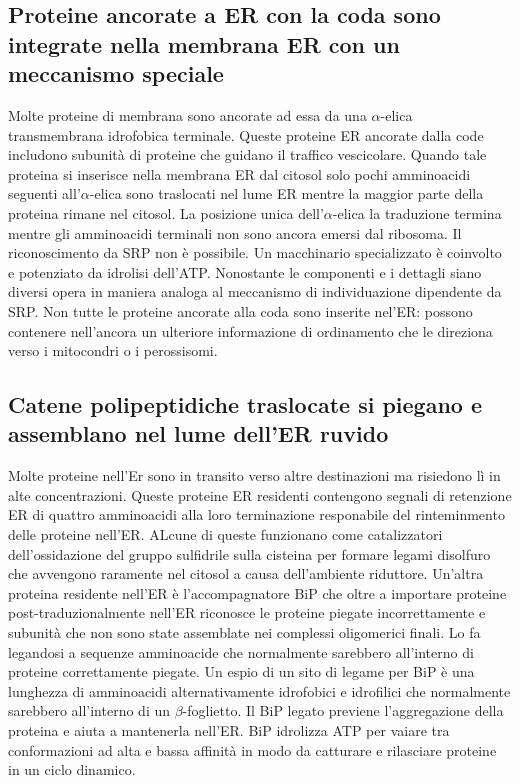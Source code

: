 \subsection{Proteine ancorate a ER con la coda sono integrate nella membrana ER con un meccanismo speciale}
Molte proteine di membrana sono ancorate ad essa da una $\alpha$-elica transmembrana idrofobica  terminale. Queste proteine ER ancorate dalla code includono subunit\`a di proteine 
che guidano il traffico vescicolare. Quando tale proteina si inserisce nella membrana ER dal citosol  solo pochi amminoacidi seguenti all'$\alpha$-elica sono traslocati nel lume ER 
mentre la maggior parte della proteina rimane nel citosol. La posizione unica dell'$\alpha$-elica la traduzione termina mentre gli amminoacidi  terminali non sono ancora emersi
dal ribosoma. Il riconoscimento da SRP non \`e possibile. Un macchinario specializzato \`e coinvolto e potenziato da idrolisi dell'ATP. Nonostante le componenti e i dettagli  siano 
diversi opera in maniera analoga al meccanismo di individuazione dipendente da SRP. Non tutte le proteine ancorate alla coda sono inserite nel'ER: possono contenere nell'ancora
un ulteriore informazione di ordinamento che le direziona verso i mitocondri o i perossisomi. 
\subsection{Catene polipeptidiche traslocate si piegano e assemblano nel lume dell'ER ruvido}
Molte proteine nell'Er sono in transito verso altre destinazioni ma risiedono l\`i in alte concentrazioni. Queste proteine ER residenti contengono segnali di retenzione ER di quattro
amminoacidi alla loro terminazione  responabile del rinteminmento delle proteine nell'ER. ALcune di queste funzionano come catalizzatori dell'ossidazione del gruppo sulfidrile
sulla cisteina per formare legami disolfuro che avvengono raramente nel citosol a causa dell'ambiente riduttore. Un'altra proteina residente nell'ER \`e l'accompagnatore BiP che oltre
a importare proteine post-traduzionalmente nell'ER riconosce le proteine piegate incorrettamente e subunit\`a che non sono state assemblate nei complessi oligomerici finali. Lo fa
legandosi a sequenze amminoacide che normalmente sarebbero all'interno di proteine correttamente piegate. Un espio di un sito di legame per BiP \`e una lunghezza di amminoacidi 
alternativamente idrofobici e idrofilici che normalmente sarebbero all'interno di un $\beta$-foglietto. Il BiP legato previene l'aggregazione della proteina e aiuta a mantenerla nell'ER.
BiP idrolizza ATP per vaiare tra conformazioni ad alta e bassa affinit\`a in modo da catturare e rilasciare proteine in un ciclo dinamico.
